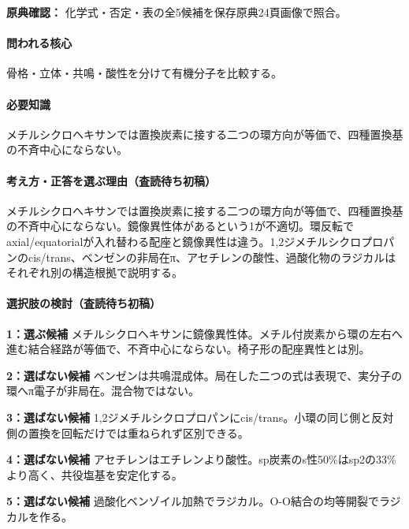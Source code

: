 \noindent\textbf{原典確認：} 化学式・否定・表の全5候補を保存原典24頁画像で照合。\par

\paragraph{問われる核心} 骨格・立体・共鳴・酸性を分けて有機分子を比較する。

\paragraph{必要知識} メチルシクロヘキサンでは置換炭素に接する二つの環方向が等価で、四種置換基の不斉中心にならない。

\paragraph{考え方・正答を選ぶ理由（査読待ち初稿）} メチルシクロヘキサンでは置換炭素に接する二つの環方向が等価で、四種置換基の不斉中心にならない。鏡像異性体があるという1が不適切。環反転でaxial/equatorialが入れ替わる配座と鏡像異性は違う。1,2ジメチルシクロプロパンのcis/trans、ベンゼンの非局在π、アセチレンの酸性、過酸化物のラジカルはそれぞれ別の構造根拠で説明する。

\paragraph{選択肢の検討（査読待ち初稿）}\mbox{}\par

\noindent\textbf{1：選ぶ候補} メチルシクロヘキサンに鏡像異性体。メチル付炭素から環の左右へ進む結合経路が等価で、不斉中心にならない。椅子形の配座異性とは別。\par

\noindent\textbf{2：選ばない候補} ベンゼンは共鳴混成体。局在した二つの式は表現で、実分子の環へπ電子が非局在。混合物ではない。\par

\noindent\textbf{3：選ばない候補} 1,2ジメチルシクロプロパンにcis/trans。小環の同じ側と反対側の置換を回転だけでは重ねられず区別できる。\par

\noindent\textbf{4：選ばない候補} アセチレンはエチレンより酸性。sp炭素のs性50\%はsp2の33\%より高く、共役塩基を安定化する。\par

\noindent\textbf{5：選ばない候補} 過酸化ベンゾイル加熱でラジカル。O-O結合の均等開裂でラジカルを作る。\par

